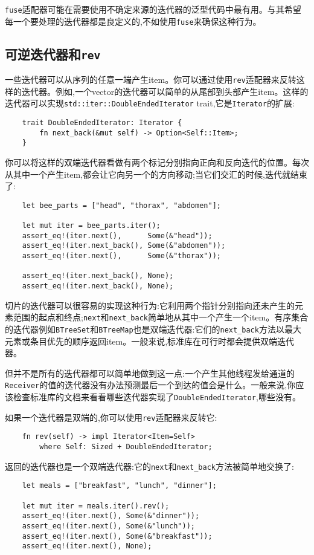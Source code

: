 \texttt{fuse}适配器可能在需要使用不确定来源的迭代器的泛型代码中最有用。与其希望每一个要处理的迭代器都是良定义的,不如使用\texttt{fuse}来确保这种行为。

\subsection{可逆迭代器和\texttt{rev}}
一些迭代器可以从序列的任意一端产生item。你可以通过使用\texttt{rev}适配器来反转这样的迭代器。例如,一个vector的迭代器可以简单的从尾部到头部产生item。这样的迭代器可以实现\texttt{std::iter::DoubleEndedIterator} trait,它是\texttt{Iterator}的扩展:
\begin{verbatim}
    trait DoubleEndedIterator: Iterator {
        fn next_back(&mut self) -> Option<Self::Item>;
    }
\end{verbatim}

你可以将这样的双端迭代器看做有两个标记分别指向正向和反向迭代的位置。每次从其中一个产生item,都会让它向另一个的方向移动;当它们交汇的时候,迭代就结束了:
\begin{verbatim}
    let bee_parts = ["head", "thorax", "abdomen"];

    let mut iter = bee_parts.iter();
    assert_eq!(iter.next(),      Some(&"head"));
    assert_eq!(iter.next_back(), Some(&"abdomen"));
    assert_eq!(iter.next(),      Some(&"thorax"));

    assert_eq!(iter.next_back(), None);
    assert_eq!(iter.next_back(), None);
\end{verbatim}

切片的迭代器可以很容易的实现这种行为:它利用两个指针分别指向还未产生的元素范围的起点和终点;\texttt{next}和\texttt{next\_back}简单地从其中一个产生一个item。有序集合的迭代器例如\texttt{BTreeSet}和\texttt{BTreeMap}也是双端迭代器:它们的\texttt{next\_back}方法以最大元素或条目优先的顺序返回item。一般来说,标准库在可行时都会提供双端迭代器。

但并不是所有的迭代器都可以简单地做到这一点:一个产生其他线程发给通道的\texttt{Receiver}的值的迭代器没有办法预测最后一个到达的值会是什么。一般来说,你应该检查标准库的文档来看看哪些迭代器实现了\texttt{DoubleEndedIterator},哪些没有。

如果一个迭代器是双端的,你可以使用\texttt{rev}适配器来反转它:
\begin{verbatim}
    fn rev(self) -> impl Iterator<Item=Self>
        where Self: Sized + DoubleEndedIterator;
\end{verbatim}

返回的迭代器也是一个双端迭代器:它的\texttt{next}和\texttt{next\_back}方法被简单地交换了:
\begin{verbatim}
    let meals = ["breakfast", "lunch", "dinner"];

    let mut iter = meals.iter().rev();
    assert_eq!(iter.next(), Some(&"dinner"));
    assert_eq!(iter.next(), Some(&"lunch"));
    assert_eq!(iter.next(), Some(&"breakfast"));
    assert_eq!(iter.next(), None);
\end{verbatim}

